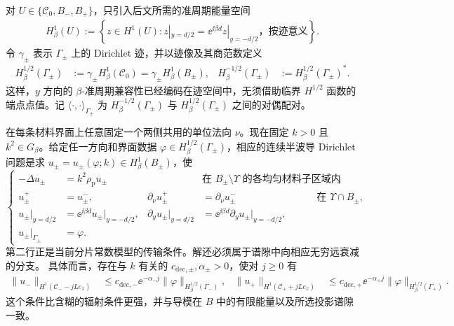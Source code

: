对 $U\in\{\mathcal{C}_0,B_-,B_+\}$，只引入后文所需的准周期能量空间
\begin{align}
  H^1_\beta(U)
  :=\left\{z\in H^1(U):
  z|_{y=d/2}=\ee^{\ii\beta d}z|_{y=-d/2}
  \text{，按迹意义}\right\}.
  \label{eq:local-quasiperiodic-space}
\end{align}
令 $\gamma_\pm$ 表示 $\Gamma_\pm$ 上的 Dirichlet 迹，并以迹像及其商范数定义
\begin{align}
  H^{1/2}_\beta(\Gamma_\pm)
  &:=\gamma_\pm H^1_\beta(\mathcal{C}_0)
    =\gamma_\pm H^1_\beta(B_\pm),
  &
  H^{-1/2}_\beta(\Gamma_\pm)
  &:=H^{1/2}_\beta(\Gamma_\pm)^*.
  \label{eq:interface-trace-spaces}
\end{align}
这样，$y$ 方向的 $\beta$-准周期兼容性已经编码在迹空间中，无须借助临界
$H^{1/2}$ 函数的端点点值。记
$\langle\cdot,\cdot\rangle_{\Gamma_\pm}$ 为
$H^{-1/2}_\beta(\Gamma_\pm)$ 与 $H^{1/2}_\beta(\Gamma_\pm)$ 之间的对偶配对。

在每条材料界面上任意固定一个两侧共用的单位法向 $\nu$。现在固定 $k>0$ 且
$k^2\in G_\beta$。给定任一方向和界面数据
$\varphi\in H^{1/2}_\beta(\Gamma_\pm)$，相应的连续半波导 Dirichlet 问题是求
$u_\pm=u_\pm(\varphi;k)\in H^1_\beta(B_\pm)$，使
\begin{equation}
  \left\{
  \begin{aligned}
    -\Delta u_\pm&=k^2\rho_{\mathrm p}u_\pm
    &&\text{在 }B_\pm\setminus\Upsilon\text{ 的各均匀材料子区域内},\\
    u_\pm^+&=u_\pm^- ,
    &\partial_\nu u_\pm^+&=\partial_\nu u_\pm^-
    &&\text{在 }\Upsilon\cap B_\pm,\\
    u_\pm|_{y=d/2}
    &=\ee^{\ii\beta d}u_\pm|_{y=-d/2},
    &\partial_yu_\pm|_{y=d/2}
    &=\ee^{\ii\beta d}\partial_yu_\pm|_{y=-d/2},\\
    u_\pm|_{\Gamma_\pm}&=\varphi.&&
  \end{aligned}
  \right.
  \label{eq:half-guide-dirichlet-problem}
\end{equation}
第二行正是当前分片常数模型的传输条件。解还必须属于谱隙中向相应无穷远衰减的分支。
具体而言，存在与 $k$ 有关的
$c_{\mathrm{dec},\pm},\alpha_\pm>0$，使对 $j\geq0$ 有
\begin{align}
  \|u_-\|_{H^1(\mathcal{C}_--jLe_x)}
  &\leq c_{\mathrm{dec},-}\ee^{-\alpha_-j}
    \|\varphi\|_{H^{1/2}_\beta(\Gamma_-)},
  &
  \|u_+\|_{H^1(\mathcal{C}_++jLe_x)}
  &\leq c_{\mathrm{dec},+}\ee^{-\alpha_+j}
    \|\varphi\|_{H^{1/2}_\beta(\Gamma_+)}.
  \label{eq:half-guide-decay}
\end{align}
这个条件比含糊的辐射条件更强，并与导模在 $B$ 中的有限能量以及所选投影谱隙一致。

